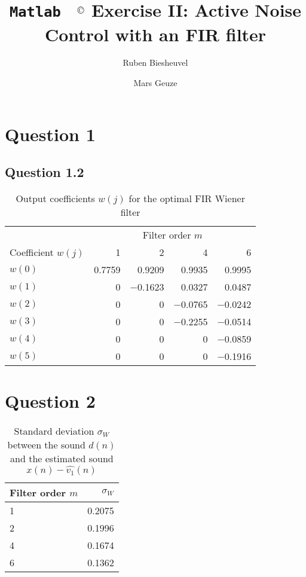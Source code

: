 \documentclass[12pt,a4paper]{article}
\title{\textbf{\texttt{Matlab}~ $^\text{{\fontsize{12}{1em}\textcopyright}}$ Exercise II: Active Noise Control with an FIR filter}}
\author[$\dagger$]{Ruben Biesheuvel}
\author[$\ddagger$]{Mars Geuze}
\affil[$\dagger$]{Student number 4076680}
\affil[$\ddagger$]{Student number 4109139}
\begin{document}
	\maketitle

\section*{Question 1}
\subsection*{Question 1.2}
\label{code1}

\begin{table}[h!]
\centering
\caption{Output coefficients $w(j)$ for the optimal FIR Wiener filter}
\begin{tabular}{l r r r r}
\hline
 & \multicolumn{4}{c}{Filter order $m$}\\
 \cline{2-5}
Coefficient $w(j)$ & \num{1} & \num{2} & \num{4} & \num{6} \\
\hline
$w(0)$ & \num{0.7759} & \num{0.9209}& \num{0.9935} & \num{0.9995} \\
$w(1)$ & \num{0} & \num{-0.1623}& \num{0.0327}& \num{0.0487} \\
$w(2)$ & \num{0}& \num{0}& \num{-0.0765}& \num{-0.0242}\\
$w(3)$ & \num{0}& \num{0}& \num{-0.2255}& \num{-0.0514}\\
$w(4)$ & \num{0}& \num{0}& \num{0}& \num{-0.0859}\\
$w(5)$ & \num{0}& \num{0}& \num{0}& \num{-0.1916}\\
\hline
\end{tabular}
\end{table}

\clearpage\section*{Question 2}

\begin{table}[h!]
\centering
\caption{Standard deviation $\sigma_{W}$ between the sound $d(n)$ and the estimated sound $x(n) - \hat{v_{1}}(n)$}
\begin{tabular}{l | r}
Filter order $m$ & $\sigma_{W}$ \\
\hline
\num{1} & \num{0.2075}\\
\num{2} & \num{0.1996}\\
\num{4} & \num{0.1674}\\
\num{6} & \num{0.1362}\\
\hline
\end{tabular}
\end{table}
\end{document}

